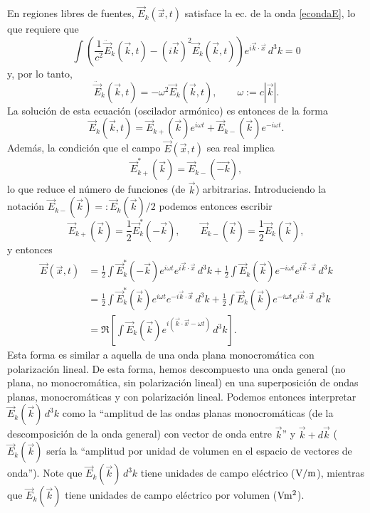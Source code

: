 En regiones libres de fuentes, $\vec{E}_k(\vec{x},t)$ satisface la ec. de la onda \eqref{econdaE}, lo que requiere que 
\begin{equation}
\int\left(\frac{1}{c^2}\ddot{\vec{E}}_k(\vec{k},t)-(i\vec{k})^2\vec{E}_k(\vec{k},t)\right)e^{i\vec{k}\cdot\vec{x}}\,d^3k=0
\end{equation}
y, por lo tanto,
\begin{equation}
\ddot{\vec{E}}_k(\vec{k},t)=-\omega^2\vec{E}_k(\vec{k},t), \qquad \omega:=c|\vec{k}|.
\end{equation}
La solución de esta ecuación (oscilador armónico) es entonces de la forma
\begin{equation}
\vec{E}_k(\vec{k},t) = \vec{E}_{k+}(\vec{k})e^{i\omega t}+\vec{E}_{k-}(\vec{k})e^{-i\omega t}.
\end{equation}
Además, la condición que el campo $\vec{E}(\vec{x},t)$ sea real implica
\begin{equation}
\vec{E}^*_{k+}(\vec{k}) = \vec{E}_{k-}(\vec{-k}),
\end{equation}
lo que reduce el número de funciones (de $\vec{k}$) arbitrarias. Introduciendo la notación $\vec{E}_{k-}(\vec{k}) =: \vec{E}_{k}(\vec{k})/2$ podemos entonces escribir
\begin{equation}
\vec{E}_{k+}(\vec{k}) = \frac{1}{2}\vec{E}^*_{k}(-\vec{k}),   \qquad \vec{E}_{k-}(\vec{k})= \frac{1}{2}\vec{E}_{k}(\vec{k}),
\end{equation}
y entonces
\begin{align}
\vec{E}(\vec{x},t) &= \frac{1}{2}\int\vec{E}^*_{k}(-\vec{k})e^{i\omega t}e^{i\vec{k}\cdot\vec{x}}\,d^3k + \frac{1}{2}\int\vec{E}_{k}(\vec{k})e^{-i\omega t}e^{i\vec{k}\cdot\vec{x}}\,d^3k \\
&= \frac{1}{2}\int\vec{E}^*_{k}(\vec{k})e^{i\omega t}e^{-i\vec{k}\cdot\vec{x}}\,d^3k + \frac{1}{2}\int\vec{E}_{k}(\vec{k})e^{-i\omega t}e^{i\vec{k}\cdot\vec{x}}\,d^3k \\
&= \Re\left[\int\vec{E}_{k}(\vec{k})e^{i(\vec{k}\cdot\vec{x}-\omega t)}\,d^3k\right].
\end{align}
Esta forma es similar a aquella de una onda plana monocromática con polarización lineal. De esta forma, hemos descompuesto una onda general (no plana, no monocromática, sin polarización lineal) en una superposición de ondas planas, monocromáticas y con polarización lineal. Podemos entonces interpretar $\vec{E}_{k}(\vec{k})\,d^3k$ como la ``amplitud de las ondas planas monocromáticas (de la descomposición de la onda general) con vector de onda entre $\vec{k}$'' y $\vec{k}+d\vec{k}$ ($\vec{E}_{k}(\vec{k})$ sería la ``amplitud por unidad de volumen en el espacio de vectores de onda''). Note que $\vec{E}_{k}(\vec{k})\,d^3k$ tiene unidades de campo eléctrico ($\rm V/m$), mientras que $\vec{E}_{k}(\vec{k})$ tiene unidades de campo eléctrico por volumen ($\rm V m^2$).

